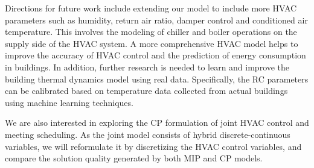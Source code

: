 Directions for future work include extending our model to include more HVAC parameters such as humidity, return air ratio, damper control and conditioned air temperature. This involves the modeling of chiller and boiler operations on the supply side of the HVAC system. A more comprehensive HVAC model helps to improve the accuracy of HVAC control and the prediction of energy consumption in buildings. In addition, further research is needed to learn and improve the building thermal dynamics model using real data. Specifically, the RC parameters can be calibrated based on temperature data collected from actual buildings using machine learning techniques. 

We are also interested in exploring the CP formulation of joint HVAC control and meeting scheduling. As the joint model consists of hybrid discrete-continuous variables, we will reformulate it by discretizing the HVAC control variables, and compare the solution quality generated by both MIP and CP models. 











